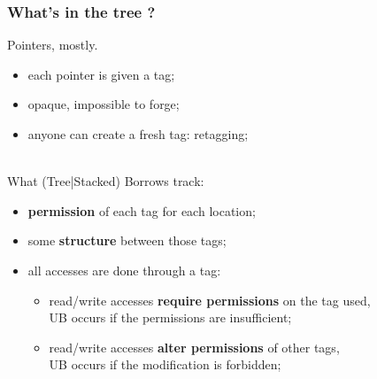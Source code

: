 \begin{frame}
    \frametitle{What's in the tree ?}
    Pointers, mostly.

    \begin{itemize}
        \item each pointer is given a tag;
        \item opaque, impossible to forge;
        \item anyone can create a fresh tag: retagging;
    \end{itemize}
    ~\\
    What (Tree|Stacked) Borrows track:
    \begin{itemize}
        \item \textbf{permission} of each tag for each location;
        \item some \textbf{structure} between those tags;
        \item all accesses are done through a tag:
            \begin{itemize}
                \item read/write accesses \textbf{require permissions} on the tag used,\\
                    UB occurs if the permissions are insufficient;
                \item read/write accesses \textbf{alter permissions} of other tags,\\
                    UB occurs if the modification is forbidden;
            \end{itemize}
    \end{itemize}
\end{frame}

